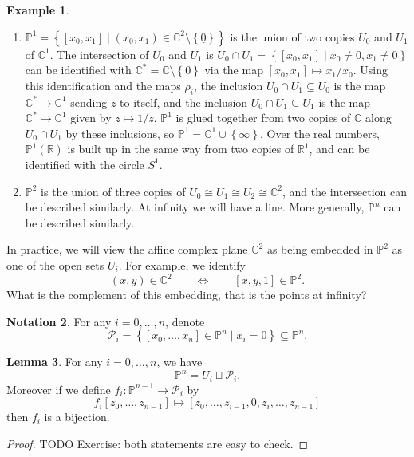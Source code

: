 \documentclass{article}
\newcommand{\R}{\mathbb{R}}
\newcommand{\C}{\mathbb{C}}
\renewcommand{\P}{\mathbb{P}}
\newcommand{\rb}[1]{\left( #1 \right)}
\renewcommand{\sb}[1]{\left[ #1 \right]}
\newcommand{\cb}[1]{\left\{ #1 \right\}}
\theoremstyle{definition}\newtheorem{definition}{Definition}[section]
\theoremstyle{definition}\newtheorem{notation}[definition]{Notation}
\theoremstyle{definition}\newtheorem{remark}[definition]{Remark}
\theoremstyle{definition}\newtheorem{example}[definition]{Example}
\theoremstyle{definition}\newtheorem{fact}{Fact}
\theoremstyle{definition}\newtheorem{exercise}{Exercise}
\newtheorem{lemma}[definition]{Lemma}
\begin{document}
\begin{example}
\hfill
\begin{enumerate}
\item $ \P^1 = \cb{\sb{x_0, x_1} \mid \rb{x_0, x_1} \in \C^2 \setminus \cb{\underline{0}}} $ is the union of two copies $ U_0 $ and $ U_1 $ of $ \C^1 $. The intersection of $ U_0 $ and $ U_1 $ is $ U_0 \cap U_1 = \cb{\sb{x_0, x_1} \mid x_0 \ne 0, x_1 \ne 0} $ can be identified with $ \C^* = \C \setminus \cb{0} $ via the map $ \sb{x_0, x_1} \mapsto x_1 / x_0 $. Using this identification and the maps $ \rho_i $, the inclusion $ U_0 \cap U_1 \subseteq U_0 $ is the map $ \C^* \to \C^1 $ sending $ z $ to itself, and the inclusion $ U_0 \cap U_1 \subseteq U_1 $ is the map $ \C^* \to \C^1 $ given by $ z \mapsto 1 / z $. $ \P^1 $ is glued together from two copies of $ \C $ along $ U_0 \cap U_1 $ by these inclusions, so $ \P^1 = \C^1 \cup \cb{\infty} $. Over the real numbers, $ \P^1\rb{\R} $ is built up in the same way from two copies of $ \R^1 $, and can be identified with the circle $ S^1 $.
\item $ \P^2 $ is the union of three copies of $ U_0 \cong U_1 \cong U_2 \cong \C^2 $, and the intersection can be described similarly. At infinity we will have a line. More generally, $ \P^n $ can be described similarly.
\end{enumerate}
\end{example}

In practice, we will view the affine complex plane $ \C^2 $ as being embedded in $ \P^2 $ as one of the open sets $ U_i $. For example, we identify
$$ \rb{x, y} \in \C^2 \qquad \iff \qquad \sb{x, y, 1} \in \P^2. $$
What is the complement of this embedding, that is the points at infinity?

\begin{notation}
For any $ i = 0, \dots, n $, denote
$$ \mathcal{P}_i = \cb{\sb{x_0, \dots, x_n} \in \P^n \mid x_i = 0} \subseteq \P^n. $$
\end{notation}

\begin{lemma}
\label{lem:3.13}
For any $ i = 0, \dots, n $, we have
$$ \P^n = U_i \sqcup \mathcal{P}_i. $$
Moreover if we define $ f_i : \P^{n - 1} \to \mathcal{P}_i $ by
$$ f_i\sb{z_0, \dots, z_{n - 1}} \mapsto \sb{z_0, \dots, z_{i - 1}, 0, z_i, \dots, z_{n - 1}} $$
then $ f_i $ is a bijection.
\end{lemma}

\begin{proof}
TODO Exercise: both statements are easy to check.
\end{proof}
\end{document}
